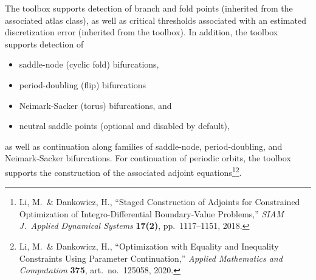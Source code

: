 The  toolbox supports detection of branch and fold points (inherited from the associated atlas class), as well as critical thresholds associated with an estimated discretization error (inherited from the  toolbox). In addition, the  toolbox supports detection of
\begin{itemize}
\item saddle-node (cyclic fold) bifurcations,
\item period-doubling (flip) bifurcations
\item Neimark-Sacker (torus) bifurcations, and
\item neutral saddle points (optional and disabled by default), 
\end{itemize}
as well as continuation along families of saddle-node, period-doubling, and Neimark-Sacker bifurcations. For continuation of periodic orbits, the  toolbox supports the construction of the associated adjoint equations\footnote{Li, M.~\& Dankowicz, H., ``Staged Construction of Adjoints for Constrained Optimization of Integro-Differential Boundary-Value Problems,'' \emph{SIAM J.~Applied Dynamical Systems} \textbf{17(2)}, pp.~1117--1151, 2018.}\footnote{Li, M.~\& Dankowicz, H., ``Optimization with Equality and Inequality Constraints Using Parameter Continuation,'' \emph{Applied Mathematics and Computation} \textbf{375}, art.~no.~125058, 2020.}.


